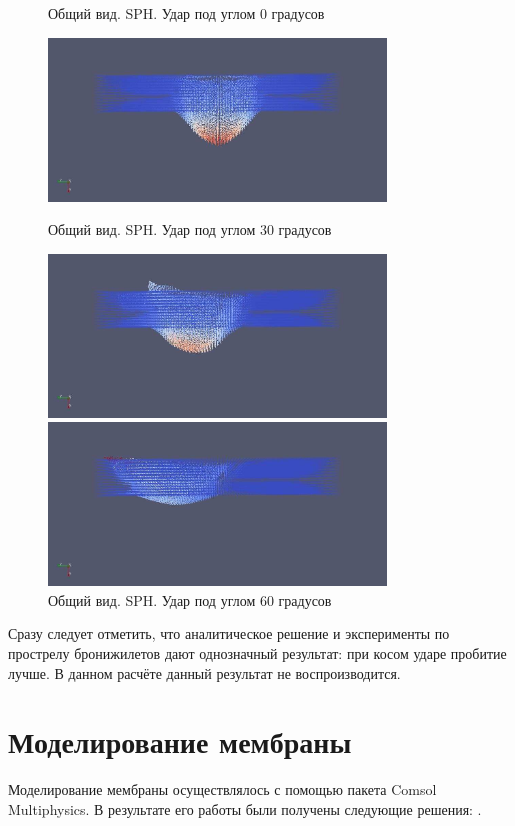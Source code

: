 \begin{figure}[H]
    \centering

    \caption{Общий вид. SPH. Удар под углом 0 градусов}
    \includegraphics[width=0.8\textwidth]{img/sph_0.png}

    \caption{Общий вид. SPH. Удар под углом 30 градусов}
    \includegraphics[width=0.8\textwidth]{img/sph_30.png}

    \caption{Общий вид. SPH. Удар под углом 60 градусов}
    \includegraphics[width=0.8\textwidth]{img/sph_60.png}
\end{figure}

Сразу следует отметить, что аналитическое решение и эксперименты по прострелу бронижилетов дают однозначный результат:
при косом ударе пробитие лучше.
В данном расчёте данный результат не воспроизводится.

\section{Моделирование мембраны}\label{sec:model-membrane}
Моделирование мембраны осуществлялось с помощью пакета Comsol Multiphysics.
В результате его работы были получены следующие решения: .

